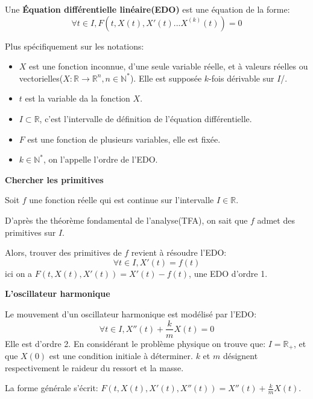 \documentclass{article}
\begin{document}
\begin{tcolorbox}[colback=red!5!white,colframe=red!75!black,title=Définition 1.1]

Une \textbf{Équation différentielle linéaire(EDO)} est une équation de la forme:
\[
\forall t \in I, F(t, X(t), X'(t)... X^{(k)}(t)) = 0 
\] 

Plus spécifiquement sur les notations:


\begin{itemize}
 \item $X$ est une fonction inconnue, d'une seule variable réelle, et à valeurs réelles ou vectorielles($X: \mathbb{R} \rightarrow \mathbb{R}^{n}, n \in \mathbb{N}^{*}$). Elle est supposée $k$-fois dérivable sur $I$/.
 \item $t$ est la variable da la fonction $X$.
 \item $I \subset \mathbb{R}$, c'est l'intervalle de définition de l'équation différentielle.
 \item $F$ est une fonction de plusieurs variables, elle est fixée.
 \item $k \in \mathbb{N}^{*}$, on l'appelle l'ordre de l'EDO.
 
\end{itemize}

\end{tcolorbox}

\begin{tcolorbox}[colback=cyan!5!white,colframe=cyan!75!black,title=Exemple 1.1]

\textbf{Chercher les primitives}

Soit $f$ une fonction réelle qui est continue sur l'intervalle $I \in \mathbb{R}$. 

D'après the théorème fondamental de l'analyse(TFA), on sait que $f$ admet des primitives sur $I$. 

Alors, trouver des primitives de $f$ revient à résoudre l'EDO:
\[
\forall t \in I, X'(t) = f(t)
\]
ici on a $F(t, X(t), X'(t)) = X'(t) - f(t)$, une EDO d'ordre 1.

\end{tcolorbox}

\begin{tcolorbox}[colback=cyan!5!white,colframe=cyan!75!black,title=Exemple 1.2]

\textbf{L'oscillateur harmonique}

Le mouvement d'un oscillateur harmonique est modélisé par l'EDO:  
\[
\forall t \in I, X''(t) + \frac{k}{m}X(t) = 0
\]
Elle est d'ordre 2. En considérant le problème physique on trouve que: $I = \mathbb{R}_{+}$, et que $X(0)$ est une condition initiale à déterminer. $k$ et $m$ désignent respectivement le raideur du ressort et la masse.

La forme générale s'écrit: $F(t, X(t), X'(t), X''(t)) = X''(t) + \frac{k}{m}X(t)$.

\end{tcolorbox}
\end{document}
